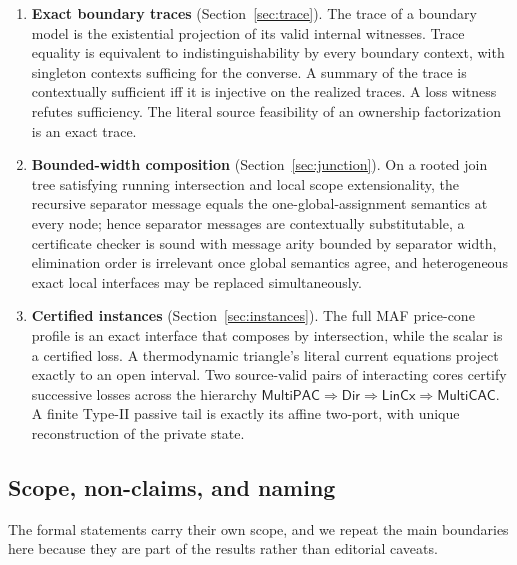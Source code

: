 \documentclass[11pt,a4paper]{article}
\theoremstyle{plain}
\theoremstyle{definition}
\theoremstyle{remark}
\newcommand{\MPAC}{\mathsf{MultiPAC}}
\newcommand{\MCAC}{\mathsf{MultiCAC}}
\newcommand{\DIR}{\mathsf{Dir}}
\newcommand{\LCC}{\mathsf{LinCx}}
\begin{document}
\begin{enumerate}[label=\textbf{(\Roman*)}]
\item \textbf{Exact boundary traces} (Section~\ref{sec:trace}). The trace of a boundary model is the existential projection of its valid internal witnesses. Trace equality is equivalent to indistinguishability by every boundary context, with singleton contexts sufficing for the converse. A summary of the trace is contextually sufficient iff it is injective on the realized traces. A loss witness refutes sufficiency. The literal source feasibility of an ownership factorization is an exact trace.
\item \textbf{Bounded-width composition} (Section~\ref{sec:junction}). On a rooted join tree satisfying running intersection and local scope extensionality, the recursive separator message equals the one-global-assignment semantics at every node; hence separator messages are contextually substitutable, a certificate checker is sound with message arity bounded by separator width, elimination order is irrelevant once global semantics agree, and heterogeneous exact local interfaces may be replaced simultaneously.
\item \textbf{Certified instances} (Section~\ref{sec:instances}). The full MAF price-cone profile is an exact interface that composes by intersection, while the scalar is a certified loss. A thermodynamic triangle's literal current equations project exactly to an open interval. Two source-valid pairs of interacting cores certify successive losses across the hierarchy $\MPAC\Rightarrow\DIR\Rightarrow\LCC\Rightarrow\MCAC$. A finite Type-II passive tail is exactly its affine two-port, with unique reconstruction of the private state.
\end{enumerate}

\subsection{Scope, non-claims, and naming}\label{sec:nonclaims}

The formal statements carry their own scope, and we repeat the main boundaries here because they are part of the results rather than editorial caveats.
\end{document}

